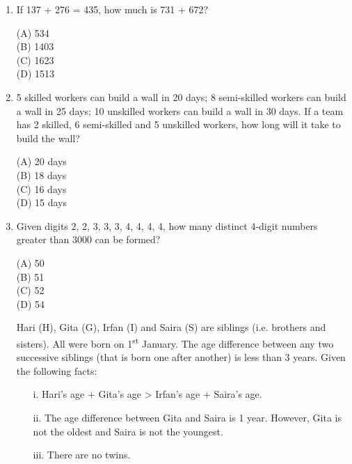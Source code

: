 \documentclass[journal,12pt,onecolumn]{IEEEtran}
\theoremstyle{remark}
\begin{document}
\begin{enumerate}
\noindent\item If 137 + 276 = 435, how much is 731 + 672?

\hfill{}

\begin{multicols}{4}
\noindent(A) 534\\
(B) 1403\\
(C) 1623\\
(D) 1513
\end{multicols}

\setlength{\parskip}{0.5cm}

\noindent\item 5 skilled workers can build a wall in 20 days; 8 semi-skilled workers can build a wall in 25 days; 10 unskilled workers can build a wall in 30 days. If a team has 2 skilled, 6 semi-skilled and 5 unskilled workers, how long will it take to build the wall?

\hfill{}

\begin{multicols}{4}
\noindent(A) 20 days\\
(B) 18 days\\
(C) 16 days\\
(D) 15 days
\end{multicols}

\setlength{\parskip}{0.5cm}

\noindent\item Given digits 2, 2, 3, 3, 3, 4, 4, 4, 4, how many distinct 4-digit numbers greater than 3000 can be formed?

\hfill{}

\begin{multicols}{4}
\noindent(A) 50\\
(B) 51\\
(C) 52\\
(D) 54
\end{multicols}


\noindent Hari (H), Gita (G), Irfan (I) and Saira (S) are siblings (i.e. brothers and sisters). All were born on 1\textsuperscript{st} January. The age difference between any two successive siblings (that is born one after another) is less than 3 years. Given the following facts:

\begin{itemize}
  \item[i.] Hari’s age + Gita’s age > Irfan’s age + Saira’s age.
  \item[ii.] The age difference between Gita and Saira is 1 year. However, Gita is not the oldest and Saira is not the youngest.
  \item[iii.] There are no twins.
\end{itemize}


\end{enumerate}
\end{document}
